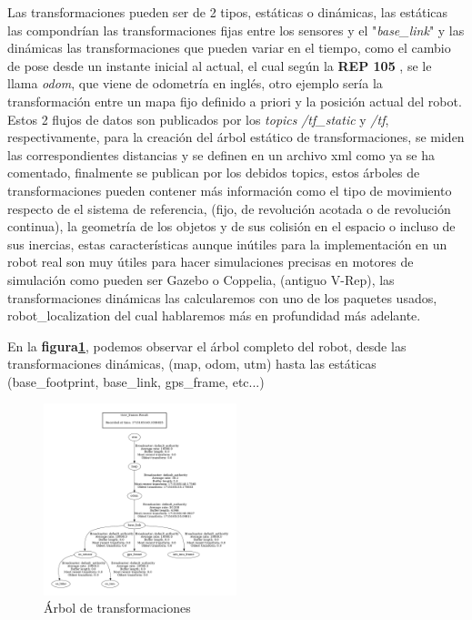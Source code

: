 Las transformaciones pueden ser de 2 tipos, estáticas o dinámicas, las estáticas las compondrían las transformaciones fijas entre los 
sensores y el "\textit{base\_link}" y las dinámicas las transformaciones que pueden variar en el tiempo, como el cambio de pose desde 
un instante inicial al actual, el cual según la \textbf{REP 105} , se le llama \textit{odom}, que viene de odometría en inglés, otro 
ejemplo sería la transformación entre un mapa fijo definido a priori y la posición actual del robot. Estos 2 flujos de datos son publicados 
por los \textit{topics} \textit{/tf\_static} y \textit{/tf}, respectivamente, para la creación del árbol estático de transformaciones, se 
miden las correspondientes distancias y se definen en un archivo xml como ya se ha comentado, finalmente se publican por los debidos topics, 
estos árboles de transformaciones pueden contener más información como el tipo de movimiento respecto de el sistema de referencia, 
(fijo, de revolución acotada o de revolución continua), la geometría de los objetos y de sus colisión en el espacio o incluso de sus 
inercias, estas características aunque inútiles para la implementación en un robot real son muy útiles para hacer simulaciones precisas 
en motores de simulación como pueden ser Gazebo o Coppelia, (antiguo V-Rep), las transformaciones dinámicas las calcularemos con uno de 
los paquetes usados, robot\_localization del cual hablaremos más en profundidad más adelante.

En la  \textbf{figura\ref{fig:arbol_urdf}}, podemos observar el árbol completo del robot, desde las transformaciones dinámicas, 
(map, odom, utm) hasta las estáticas (base\_footprint, base\_link, gps\_frame, etc...)

\begin{figure}[h]
    \centering
    \includegraphics[width=0.5\textwidth]{images/arbol_transformaciones_hunter.jpg}
    \caption{Árbol de transformaciones}
    \label{fig:arbol_urdf}
\end{figure}


